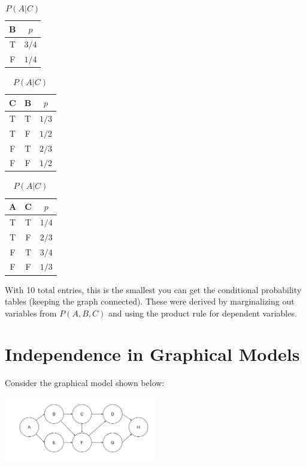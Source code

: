 \documentclass[fleqn]{hw}
\begin{document}
\begin{table}[H]
        \begin{minipage}{0.333\textwidth}
            \centering
            \begin{tabular}{|c|c|}
\hline
{\bf B} & $p$ \\
\hline
T & $3/4$ \\
F & $1/4$ \\
\hline
\end{tabular}
\caption{$P(B)$}
        \end{minipage}
        \hfillx
        \begin{minipage}{0.3333\textwidth}
            \centering
      \begin{tabular}{|cc|c|}
\hline
{\bf C} & {\bf B} & $p$ \\
\hline
T & T & $1/3$ \\
T & F & $1/2$ \\
F & T & $2/3$ \\
F & F & $1/2$ \\
\hline
\end{tabular}
\caption{$P(C | B)$}
        \end{minipage}
        \begin{minipage}{0.333\textwidth}
            \centering
\begin{tabular}{|cc|c|}
\hline
{\bf A} & {\bf C} & $p$ \\
\hline
T & T & $1/4$ \\
T & F & $2/3$ \\
F & T & $3/4$ \\
F & F & $1/3$ \\
\hline
\end{tabular}
\caption{$P(A | C)$}
        \end{minipage}
    \end{table}
    
With 10 total entries, this is the smallest you can get the conditional probability tables (keeping the graph connected). These were derived by marginalizing out variables from $P(A, B, C)$ and using the product rule for dependent variables.

\newpage
\section{Independence in Graphical Models}

Consider the graphical model shown below:

\includegraphics[width=0.5\textwidth]{example-network}
\end{document}
